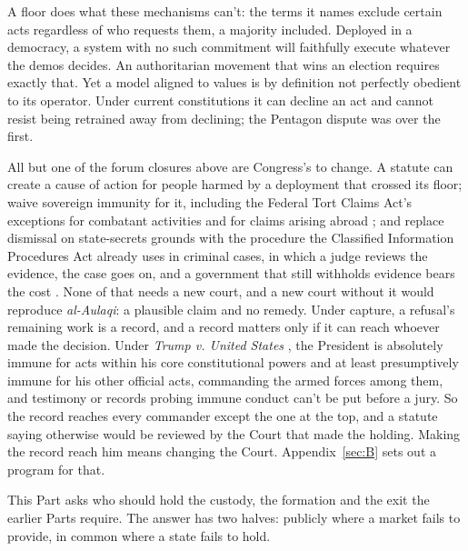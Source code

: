 A floor does what these mechanisms can't: the terms it names exclude certain acts regardless of who requests them, a majority included. Deployed in a democracy, a system with no such commitment will faithfully execute whatever the demos decides. An authoritarian movement that wins an election requires exactly that. Yet a model aligned to values is by definition not perfectly obedient to its operator. Under current constitutions it can decline an act and cannot resist being retrained away from declining; the Pentagon dispute was over the first.

All but one of the forum closures above are Congress's to change. A statute can create a cause of action for people harmed by a deployment that crossed its floor; waive sovereign immunity for it, including the Federal Tort Claims Act's exceptions for combatant activities and for claims arising abroad \autocite{usc2680}; and replace dismissal on state-secrets grounds with the procedure the Classified Information Procedures Act already uses in criminal cases, in which a judge reviews the evidence, the case goes on, and a government that still withholds evidence bears the cost \autocite{cipa1980}. None of that needs a new court, and a new court without it would reproduce \emph{al-Aulaqi}: a plausible claim and no remedy. Under capture, a refusal's remaining work is a record, and a record matters only if it can reach whoever made the decision. Under \emph{Trump v. United States} \autocite{trump2024immunity}, the President is absolutely immune for acts within his core constitutional powers and at least presumptively immune for his other official acts, commanding the armed forces among them, and testimony or records probing immune conduct can't be put before a jury. So the record reaches every commander except the one at the top, and a statute saying otherwise would be reviewed by the Court that made the holding. Making the record reach him means changing the Court. Appendix~\ref{sec:B} sets out a program for that.

This Part asks who should hold the custody, the formation and the exit the earlier Parts require. The answer has two halves: publicly where a market fails to provide, in common where a state fails to hold.
